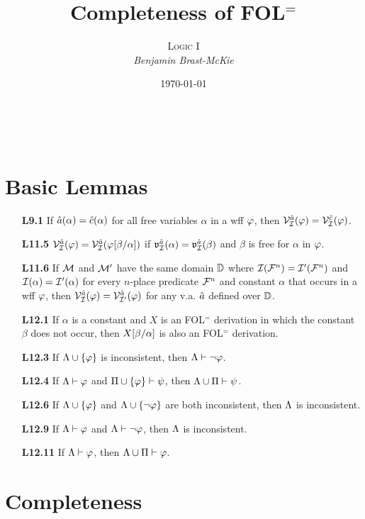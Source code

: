 \documentclass[a4paper, 11pt]{article} %
\title{\textbf{Completeness of FOL$^=$}} %
\author{\textsc{Logic I}\\ \em Benjamin Brast-McKie} %
\date{\today} %
\makeatletter
\renewcommand{\maketitle}{
\begin{flushright}
{\LARGE\@title}

\vspace{10pt}

{\@author}
\\ \@date
\end{flushright}

\vspace{-20pt}

}
\makeatother
\begin{document}
\maketitle %

\thispagestyle{empty}



\section*{Basic Lemmas}

\begin{itemize}
  \item[\bf L9.1] If $\hat{a}(\alpha)=\hat{c}(\alpha)$ for all free variables $\alpha$ in a wff $\varphi$, then $\mathcal{V}_{\mathcal{I}}^{\hat{a}}(\varphi)=\mathcal{V}_{\mathcal{I}}^{\hat{c}}(\varphi)$.
  \item[\bf L11.5] $\mathcal{V}_{\mathcal{I}}^{\hat{a}}(\varphi)=\mathcal{V}_{\mathcal{I}}^{\hat{a}}(\varphi[\beta/\alpha])$ if $\mathfrak{v}_{\mathcal{I}}^{\hat{a}}(\alpha)=\mathfrak{v}_{\mathcal{I}}^{\hat{a}}(\beta)$ and $\beta$ is free for $\alpha$ in $\varphi$.
  \item[\bf L11.6] If $\mathcal{M}$ and $\mathcal{M}'$ have the same domain $\mathbb{D}$ where $\mathcal{I}(\mathcal{F}^n)=\mathcal{I}'(\mathcal{F}^n)$ and $\mathcal{I}(\alpha)=\mathcal{I}'(\alpha)$ for every $n$-place predicate $\mathcal{F}^n$ and constant $\alpha$ that occurs in a wff $\varphi$, then $\mathcal{V}_{\mathcal{I}}^{\hat{a}}(\varphi)=\mathcal{V}_{\mathcal{I}'}^{\hat{a}}(\varphi)$ for any v.a. $\hat{a}$ defined over $\mathbb{D}$.
  \item[\bf L12.1] If $\alpha$ is a constant and $X$ is an FOL$^=$ derivation in which the constant $\beta$ does not occur, then $X[\beta/\alpha]$ is also an FOL$^=$ derivation.
  \item[\bf L12.3] If $\Lambda\cup\lbrace\varphi\rbrace$ is inconsistent, then $\Lambda\vdash\neg\varphi$.
  \item[\bf L12.4] If $\Lambda \vdash \varphi$ and $\Pi\cup\lbrace\varphi\rbrace \vdash \psi$, then $\Lambda\cup\Pi \vdash \psi$.
  \item[\bf L12.6] If $\Lambda \cup \lbrace\varphi\rbrace$ and $\Lambda\cup \lbrace\neg\varphi\rbrace$ are both inconsistent, then $\Lambda$ is inconsistent.
  \item[\bf L12.9] If $\Lambda\vdash\varphi$ and $\Lambda\vdash\neg\varphi$, then $\Lambda$ is inconsistent.
  \item[\bf L12.11] If $\Lambda\vdash\varphi$, then $\Lambda\cup\Pi\vdash\varphi$.
\end{itemize}


\section*{Completeness}
\end{document}
